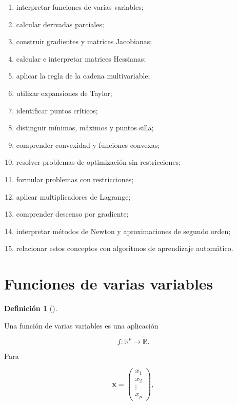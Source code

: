 \documentclass[
  spanish,
  10.5pt,
  letterpaper,
  DIV=11,
  numbers=noendperiod,
  oneside,
  open=any]{scrreprt}
\providecommand{\tightlist}{%
  \setlength{\itemsep}{0pt}\setlength{\parskip}{0pt}}
\theoremstyle{definition}
\newtheorem{definition}{Definición}[chapter]
\theoremstyle{definition}
\theoremstyle{plain}
\theoremstyle{remark}
\begin{document}
\begin{enumerate}
\def\labelenumi{\arabic{enumi}.}
\tightlist
\item
  interpretar funciones de varias variables;
\item
  calcular derivadas parciales;
\item
  construir gradientes y matrices Jacobianas;
\item
  calcular e interpretar matrices Hessianas;
\item
  aplicar la regla de la cadena multivariable;
\item
  utilizar expansiones de Taylor;
\item
  identificar puntos críticos;
\item
  distinguir mínimos, máximos y puntos silla;
\item
  comprender convexidad y funciones convexas;
\item
  resolver problemas de optimización sin restricciones;
\item
  formular problemas con restricciones;
\item
  aplicar multiplicadores de Lagrange;
\item
  comprender descenso por gradiente;
\item
  interpretar métodos de Newton y aproximaciones de segundo orden;
\item
  relacionar estos conceptos con algoritmos de aprendizaje automático.
\end{enumerate}

\section*{Funciones de varias
variables}\label{funciones-de-varias-variables}


\begin{definition}[]\protect\hypertarget{def-funcion-multivariable}{}\label{def-funcion-multivariable}

Una función de varias variables es una aplicación

\[
f:\mathbb{R}^{p}\to\mathbb{R}.
\]

\end{definition}

Para

\[
\mathbf{x}
=
\begin{pmatrix}
x_1\\
x_2\\
\vdots\\
x_p
\end{pmatrix},
\]
\end{document}
